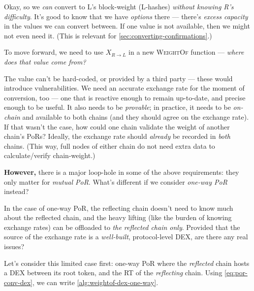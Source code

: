 Okay, so we \emph{can} convert to L's block-weight (L-hashes) \emph{without knowing R's difficulty}.
It's good to know that we have \emph{options} there --- there's \emph{excess capacity} in the values we can convert between.
If one value is not available, then we might not even need it.
(This is relevant for \autoref{sec:converting-confirmations}.)

To move forward, we need to use $X_{R\rightarrow L}$ in a new \textsc{WeightOf} function --- \emph{where does that value come from?}

The value can't be hard-coded, or provided by a third party --- these would introduce vulnerabilities.
We need an accurate exchange rate for the moment of conversion, too --- one that is reactive enough to remain up-to-date, and precise enough to be useful.
It also needs to be \emph{provable}; in practice, it needs to be \emph{on-chain} and available to both chains (and they should agree on the exchange rate).
If that wasn't the case, how could one chain validate the weight of another chain's PoRs?
Ideally, the exchange rate should \emph{already} be recorded in \emph{both} chains.
(This way, full nodes of either chain do not need extra data to calculate/verify chain-weight.)

\textbf{However,} there is a major loop-hole in some of the above requirements: they only matter for \emph{mutual PoR}.
What's different if we consider \emph{one-way PoR} instead?

In the case of one-way PoR, the reflecting chain doesn't need to know much about the reflected chain, and the heavy lifting (like the burden of knowing exchange rates) can be offloaded to \emph{the reflected chain only}.
Provided that the source of the exchange rate is a \emph{well-built}, protocol-level DEX, are there any real issues?

Let's consider this limited case first: one-way PoR where the \emph{reflected} chain hosts a DEX between its root token, and the RT of the \emph{reflecting} chain.
Using \autoref{eq:por-conv-dex}, we can write \autoref{alg:weightof-dex-one-way}.


